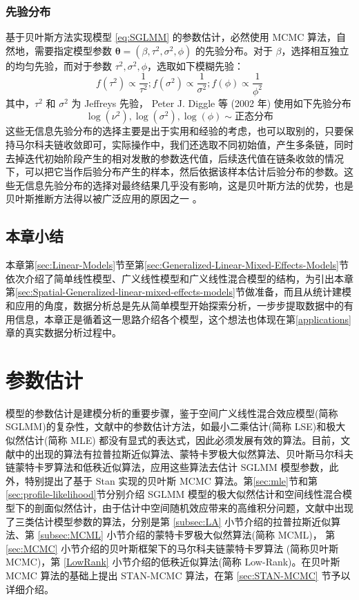 \documentclass[12pt,a4paper,UTF8,twoside]{book}
\theoremstyle{definition}
\theoremstyle{definition}
\theoremstyle{definition}
\theoremstyle{remark}
\begin{document}
\hypertarget{subsec:prior-sglmm}{%
\subsection{先验分布}\label{subsec:prior-sglmm}}

基于贝叶斯方法实现模型 \eqref{eq:SGLMM} 的参数估计，必然使用 MCMC
算法，自然地，需要指定模型参数
\(\boldsymbol{\theta} = (\beta,\tau^2,\sigma^2,\phi)\) 的先验分布。对于
\(\beta\)，选择相互独立的均匀先验，而对于参数
\(\tau^2,\sigma^2,\phi\)，选取如下模糊先验：
\[f(\tau^2) \propto \frac{1}{\tau^2};f(\sigma^2) \propto \frac{1}{\sigma^2};f(\phi) \propto \frac{1}{\phi^2}\]
\noindent 其中，\(\tau^2\) 和 \(\sigma^2\) 为 Jeffreys 先验， Peter J.
Diggle 等 (2002 年) \citep{Diggle2002Childhood} 使用如下先验分布
\begin{equation*}
\log(\nu^2),\log(\sigma^2),\log(\phi)  \sim \text{正态分布}
\end{equation*}
这些无信息先验分布的选择主要是出于实用和经验的考虑，也可以取别的，只要保持马尔科夫链收敛即可，实际操作中，我们还选取不同初始值，产生多条链，同时去掉迭代初始阶段产生的相对发散的参数迭代值，后续迭代值在链条收敛的情况下，可以把它当作后验分布产生的样本，然后依据该样本估计后验分布的参数。这些无信息先验分布的选择对最终结果几乎没有影响，这是贝叶斯方法的优势，也是贝叶斯推断方法得以被广泛应用的原因之一
\citep{mao2006}。

\hypertarget{sec:models}{%
\section{本章小结}\label{sec:models}}

本章第\ref{sec:Linear-Models}节至第\ref{sec:Generalized-Linear-Mixed-Effects-Models}节依次介绍了简单线性模型、广义线性模型和广义线性混合模型的结构，为引出本章第\ref{sec:Spatial-Generalized-linear-mixed-effects-models}节做准备，而且从统计建模和应用的角度，数据分析总是先从简单模型开始探索分析，一步步提取数据中的有用信息，本章正是循着这一思路介绍各个模型，这个想法也体现在第\ref{applications}章的真实数据分析过程中。

\hypertarget{algorithms}{%
\chapter{参数估计}\label{algorithms}}

模型的参数估计是建模分析的重要步骤，鉴于空间广义线性混合效应模型(简称
SGLMM)的复杂性，文献中的参数估计方法，如最小二乘估计(简称
LSE)和极大似然估计(简称 MLE)
都没有显式的表达式，因此必须发展有效的算法。目前，文献中的出现的算法有拉普拉斯近似算法、蒙特卡罗极大似然算法、贝叶斯马尔科夫链蒙特卡罗算法和低秩近似算法，应用这些算法去估计
SGLMM 模型参数，此外，特别提出了基于 Stan 实现的贝叶斯 MCMC
算法。第\ref{sec:mle}节和第\ref{sec:profile-likelihood}节分别介绍 SGLMM
模型的极大似然估计和空间线性混合模型下的剖面似然估计，由于估计中空间随机效应带来的高维积分问题，文献中出现了三类估计模型参数的算法，分别是第
\ref{subsec:LA} 小节介绍的拉普拉斯近似算法、第 \ref{subsec:MCML}
小节介绍的蒙特卡罗极大似然算法(简称 MCML)， 第 \ref{sec:MCMC}
小节介绍的贝叶斯框架下的马尔科夫链蒙特卡罗算法 (简称贝叶斯 MCMC)，第
\ref{LowRank} 小节介绍的低秩近似算法(简称 Low-Rank)。在贝叶斯 MCMC
算法的基础上提出 STAN-MCMC 算法，在第 \ref{sec:STAN-MCMC}
节予以详细介绍。
\end{document}

